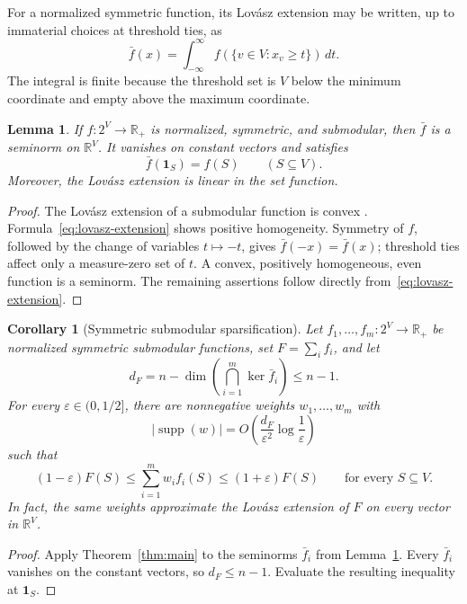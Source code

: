 \documentclass[11pt]{article}
\newtheorem{lemma}[theorem]{Lemma}
\newtheorem{corollary}[theorem]{Corollary}
\theoremstyle{remark}
\newcommand{\R}{\mathbb{R}}
\newcommand{\supp}{\operatorname{supp}}
\newcommand{\eps}{\varepsilon}
\newcommand{\one}{\bm{1}}
\begin{document}
For a normalized symmetric function, its Lov\'asz extension may be
written, up to immaterial choices at threshold ties, as
\begin{equation}\label{eq:lovasz-extension}
  \bar f(x)=\int_{-\infty}^{\infty}
  f(\{v\in V:x_v\geq t\})\,dt.
\end{equation}
The integral is finite because the threshold set is $V$ below the
minimum coordinate and empty above the maximum coordinate.

\begin{lemma}\label{lem:lovasz-seminorm}
If $f:2^V\to\R_+$ is normalized, symmetric, and submodular, then
$\bar f$ is a seminorm on $\R^V$.  It vanishes on constant vectors and
satisfies
\[
  \bar f(\one_S)=f(S)\qquad(S\subseteq V).
\]
Moreover, the Lov\'asz extension is linear in the set function.
\end{lemma}

\begin{proof}
The Lov\'asz extension of a submodular function is convex
\cite{Lovasz83}.  Formula~\eqref{eq:lovasz-extension} shows positive
homogeneity.  Symmetry of $f$, followed by the change of variables
$t\mapsto-t$, gives $\bar f(-x)=\bar f(x)$; threshold ties affect only
a measure-zero set of $t$.  A convex, positively homogeneous, even
function is a seminorm.  The remaining assertions follow directly
from~\eqref{eq:lovasz-extension}.
\end{proof}

\begin{corollary}[Symmetric submodular sparsification]
\label{cor:submodular}
Let $f_1,\ldots,f_m:2^V\to\R_+$ be normalized symmetric submodular
functions, set $F=\sum_i f_i$, and let
\[
  d_F=n-\dim\left(\bigcap_{i=1}^m\ker\bar f_i\right)\leq n-1.
\]
For every $\eps\in(0,1/2]$, there are nonnegative weights
$w_1,\ldots,w_m$ with
\[
  |\supp(w)|=O\!\left(\frac{d_F}{\eps^2}
  \log\frac1\eps\right)
\]
such that
\[
  (1-\eps)F(S)\leq\sum_{i=1}^m w_if_i(S)
  \leq(1+\eps)F(S)
  \qquad\text{for every }S\subseteq V.
\]
In fact, the same weights approximate the Lov\'asz extension of $F$
on every vector in $\R^V$.
\end{corollary}

\begin{proof}
Apply Theorem~\ref{thm:main} to the seminorms $\bar f_i$ from
Lemma~\ref{lem:lovasz-seminorm}.  Every $\bar f_i$ vanishes on the
constant vectors, so $d_F\leq n-1$.  Evaluate the resulting inequality
at $\one_S$.
\end{proof}
\end{document}
